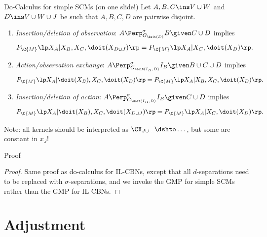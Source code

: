 \begin{frame}{Do-Calculus for simple SCMs (on one slide!)}
  Let $A,B,C \ins V \cup W$ and $D \ins V \cup W \cup J$ be such that $A,B,C,D$ are pairwise disjoint.
  \begin{enumerate}
    \item \emph{Insertion/deletion of observation}: 
      $A \Perp^\sigma_{G_{\doit(D)}} B \given C \cup D$ implies
      \[ P_{\C{M}}\lp X_A|X_B,X_C,\doit(X_{D\cup J})\rp = P_{\C{M}}\lp X_A|X_C,\doit(X_D)\rp.\]
    \item \emph{Action/observation exchange}: $A \Perp^\sigma_{G_{\doit(I_B,D)}} I_B \given B \cup C \cup D$ implies
      \[ P_{\C{M}}\lp X_A|\doit(X_B),X_C,\doit(X_D)\rp  =  P_{\C{M}}\lp X_A|X_B,X_C,\doit(X_D)\rp.\]
    \item \emph{Insertion/deletion of action}: $A \Perp^\sigma_{G_{\doit(I_B,D)}} I_B \given C  \cup D$ implies
      \[ P_{\C{M}}\lp X_A|\doit(X_B),X_C,\doit(X_{D\cup J})\rp = P_{\C{M}}\lp X_A|X_C,\doit(X_{D})\rp.\]
  \end{enumerate}
  Note: all kernels should be interpreted as $\CX_{J \cup \dots} \dshto \dots$, but some are constant in $x_J$!
\end{frame}

\begin{frame}{Proof}
  \begin{proof}
    Same proof as do-calculus for IL-CBNs, except that all $d$-separations need to be replaced with $\sigma$-separations,
    and we invoke the GMP for simple SCMs rather than the GMP for IL-CBNs.
  \end{proof}
\end{frame}

\part{Adjustment}
\frame{\partpage}

